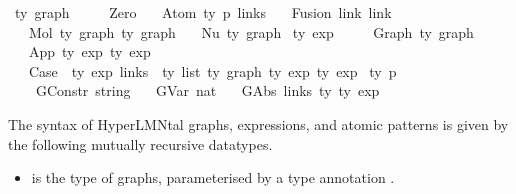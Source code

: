 \begin{isabellebody}
\isamarkupfalse%
\ {\isacharprime}{\kern0pt}ty\ graph\ {\isacharequal}{\kern0pt}\isanewline
\ \ \ \ Zero\isanewline
\ \ {\isacharbar}{\kern0pt}\ Atom\ {\isachardoublequoteopen}{\isacharprime}{\kern0pt}ty\ p{\isachardoublequoteclose}\ links\isanewline
\ \ {\isacharbar}{\kern0pt}\ Fusion\ link\ link\isanewline
\ \ {\isacharbar}{\kern0pt}\ Mol\ {\isachardoublequoteopen}{\isacharprime}{\kern0pt}ty\ graph{\isachardoublequoteclose}\ {\isachardoublequoteopen}{\isacharprime}{\kern0pt}ty\ graph{\isachardoublequoteclose}\isanewline
\ \ {\isacharbar}{\kern0pt}\ Nu\ {\isachardoublequoteopen}{\isacharprime}{\kern0pt}ty\ graph{\isachardoublequoteclose}\isanewline
{}\ {\isacharprime}{\kern0pt}ty\ exp\ {\isacharequal}{\kern0pt}\isanewline
\ \ \ \ Graph\ {\isachardoublequoteopen}{\isacharprime}{\kern0pt}ty\ graph{\isachardoublequoteclose}\isanewline
\ \ {\isacharbar}{\kern0pt}\ App\ {\isachardoublequoteopen}{\isacharprime}{\kern0pt}ty\ exp{\isachardoublequoteclose}\ {\isachardoublequoteopen}{\isacharprime}{\kern0pt}ty\ exp{\isachardoublequoteclose}\ {\isacharparenleft}{\kern0pt}\ {\isacartoucheopen}{\isasymcdot}{\isacartoucheclose}\ {}{}{}{\isacharparenright}{\kern0pt}\isanewline
\ \ {\isacharbar}{\kern0pt}\ Case\ \ {\isachardoublequoteopen}{\isacharprime}{\kern0pt}ty\ exp{\isachardoublequoteclose}\ {\isachardoublequoteopen}{\isacharparenleft}{\kern0pt}links\ {\isacharasterisk}{\kern0pt}\ {\isacharprime}{\kern0pt}ty{\isacharparenright}{\kern0pt}\ list{\isachardoublequoteclose}\ {\isachardoublequoteopen}{\isacharprime}{\kern0pt}ty\ graph{\isachardoublequoteclose}\ {\isachardoublequoteopen}{\isacharprime}{\kern0pt}ty\ exp{\isachardoublequoteclose}\ {\isachardoublequoteopen}{\isacharprime}{\kern0pt}ty\ exp{\isachardoublequoteclose}\isanewline
{}\ {\isacharprime}{\kern0pt}ty\ p\ {\isacharequal}{\kern0pt}\isanewline
\ \ \ \ GConstr\ string\isanewline
\ \ {\isacharbar}{\kern0pt}\ GVar\ nat\isanewline
\ \ {\isacharbar}{\kern0pt}\ GAbs\ links\ {\isacharprime}{\kern0pt}ty\ {\isachardoublequoteopen}{\isacharprime}{\kern0pt}ty\ exp{\isachardoublequoteclose}%
\begin{isamarkuptext}%
The syntax of HyperLMNtal graphs, expressions, and atomic patterns is
given by the following mutually recursive datatypes.

%
\begin{itemize}%
\item {} is the type of graphs, parameterised by a type annotation
.


\end{itemize}
\end{isamarkuptext}
\end{isabellebody}
